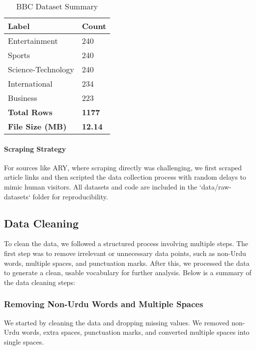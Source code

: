 \documentclass[sigconf]{acmart}
\begin{document}
\begin{table}[h]
    \caption{BBC Dataset Summary}
    \label{tab:bbc_summary}
    \begin{tabular}{|l|l|}
        \hline
        \textbf{Label} & \textbf{Count} \\
        \hline
        Entertainment & 240 \\
        Sports & 240 \\
        Science-Technology & 240 \\
        International & 234 \\
        Business & 223 \\
        \hline
        \textbf{Total Rows} & \textbf{1177} \\
        \textbf{File Size (MB)} & \textbf{12.14} \\
        \hline
    \end{tabular}
\end{table}

\paragraph{Scraping Strategy} For sources like ARY, where scraping directly was challenging, we first scraped article links and then scripted the data collection process with random delays to mimic human visitors. All datasets and code are included in the `data/raw-datasets` folder for reproducibility.

\subsection{Data Cleaning}

To clean the data, we followed a structured process involving multiple steps. The first step was to remove irrelevant or unnecessary data points, such as non-Urdu words, multiple spaces, and punctuation marks. After this, we processed the data to generate a clean, usable vocabulary for further analysis. Below is a summary of the data cleaning steps:

\subsubsection{Removing Non-Urdu Words and Multiple Spaces}

We started by cleaning the data and dropping missing values. We removed non-Urdu words, extra spaces, punctuation marks, and converted multiple spaces into single spaces.
\end{document}
